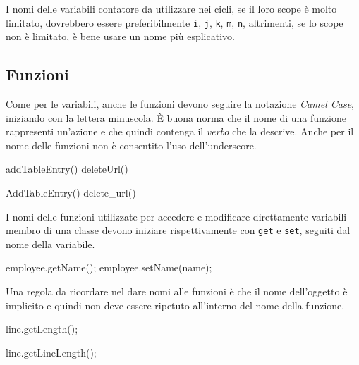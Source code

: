 I nomi delle variabili contatore da utilizzare nei cicli, se il loro scope è molto limitato, dovrebbero essere preferibilmente \texttt{i}, \texttt{j}, \texttt{k}, \texttt{m}, \texttt{n}, altrimenti, se lo scope non è limitato, è bene usare un nome più esplicativo.

\subsection{Funzioni}\label{ssec:functionname}

Come per le variabili, anche le funzioni devono seguire la notazione \emph{Camel Case}, iniziando con la lettera minuscola\cite{codestyle:geotechnical}.
È buona norma che il nome di una funzione rappresenti un'azione e che quindi contenga il \emph{verbo} che la descrive.
Anche per il nome delle funzioni non è consentito l'uso dell'underscore.    

\noindent\begin{minipage}[t]{\cbwidth}
\begin{RightCode}
addTableEntry()
deleteUrl()
\end{RightCode}
\end{minipage}%
\hspace{\cbdistance}
\begin{minipage}[t]{\cbwidth}
\begin{ErrorCode}
AddTableEntry()
delete_url()
\end{ErrorCode}
\end{minipage}

I nomi delle funzioni utilizzate per accedere e modificare direttamente variabili membro di una classe devono iniziare rispettivamente con \texttt{get} e \texttt{set}, seguiti dal nome della variabile.

\noindent\begin{minipage}[t]{\rbwidth}
\begin{RightCode}
employee.getName();
employee.setName(name);
\end{RightCode}
\end{minipage}%

Una regola da ricordare nel dare nomi alle funzioni è che il nome dell'oggetto è implicito e quindi non deve essere ripetuto all'interno del nome della funzione.

\noindent\begin{minipage}[t]{\cbwidth}
\begin{RightCode}
line.getLength();
\end{RightCode}
\end{minipage}%
\hspace{\cbdistance}
\begin{minipage}[t]{\cbwidth}
\begin{ErrorCode}
line.getLineLength();
\end{ErrorCode}
\end{minipage}

